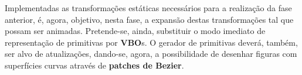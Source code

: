 \noindent
Implementadas as transformações estáticas necessários para a
realização da fase anterior, é, agora, objetivo, nesta fase,
a expansão destas transformações tal que possam ser animadas.
Pretende-se, ainda, substituir o modo imediato de representação
de primitivas por \textbf{VBO}s.
\newline
\break
\noindent
O gerador de primitivas deverá, também, ser alvo de atualizações,
dando-se, agora, a possibilidade de desenhar figuras com superfícies
curvas através de \textbf{patches de Bezier}.